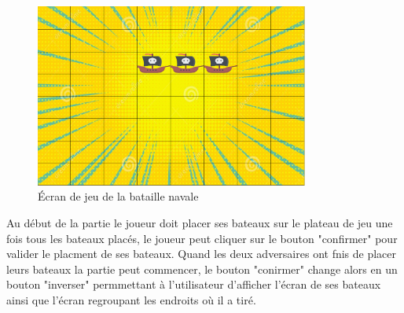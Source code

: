\documentclass{report}
\begin{document}
\begin{figure}[H]
	\centering\includegraphics[width=9cm]{notreBataille}
	\caption{Écran de jeu de la bataille navale}
    \label{notreBataille}
\end{figure}

Au début de la partie le joueur doit placer ses bateaux sur le plateau de jeu une fois
tous les bateaux placés, le joueur peut cliquer sur le bouton "confirmer" pour valider le placment de ses bateaux.
Quand les deux adversaires ont fnis de placer leurs bateaux la partie peut commencer, le bouton "conirmer" change alors en un
bouton "inverser" permmettant à l'utilisateur d'afficher l'écran de ses bateaux ainsi que l'écran regroupant les endroits où il a tiré.
\end{document}

